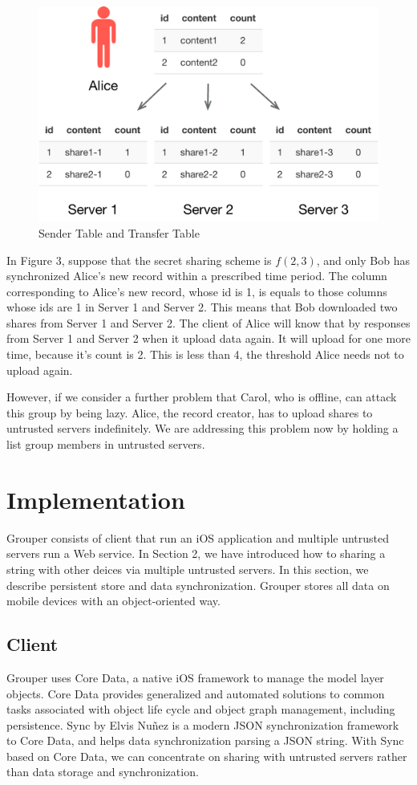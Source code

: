 \documentclass[twocolumn,10pt]{article}
\begin{document}
\begin{figure}[t]
	\centering
	\includegraphics[scale=0.4]{sync_table}
	\caption{Sender Table and Transfer Table}
\end{figure}

In Figure 3, suppose that the secret sharing scheme is $f(2, 3)$, and only Bob has synchronized Alice's new record within a prescribed time period. The column corresponding to Alice's new record, whose id is 1, is equals to those columns whose ids are 1 in Server 1 and Server 2. This means that Bob downloaded two shares from Server 1 and Server 2. The client of Alice will know that by responses from Server 1 and Server 2 when it upload data again. It will upload for one more time, because it's count is 2. This is less than 4, the threshold Alice needs not to upload again.

However, if we consider a further problem that Carol, who is offline, can attack this group by being lazy. Alice, the record creator, has to upload shares to untrusted servers indefinitely. We are addressing this problem now by holding a list group members in untrusted servers.

\section{Implementation}
Grouper consists of client that run an iOS application and multiple untrusted servers run a Web service. In Section 2, we have introduced how to sharing a string with other deices via multiple untrusted servers. In this section, we describe persistent store and data synchronization. Grouper stores all data on mobile devices with an object-oriented way.

\subsection{Client}
 Grouper uses Core Data\cite{coredata}, a native iOS framework to manage the model layer objects. Core Data provides generalized and automated solutions to common tasks associated with object life cycle and object graph management, including persistence. Sync\cite{sync} by Elvis Nu\~{n}ez is a modern JSON synchronization framework to Core Data, and helps data synchronization parsing a JSON string. With Sync based on Core Data, we can concentrate on sharing with untrusted servers rather than data storage and synchronization.
\end{document}
